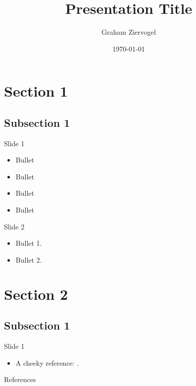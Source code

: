 \documentclass[10pt]{beamer}
\title{Presentation Title}
\author{Graham Ziervogel}
\institute{Organisation}
\date{\today}
\begin{document}
\begin{frame}
	\titlepage
\end{frame}

\section{Section 1}
\subsection{Subsection 1}

\begin{frame}{Slide 1}
\begin{itemize}
\pause
\item Bullet
\pause
\item Bullet
\pause
\item Bullet
\pause
\item Bullet
\end{itemize}
\end{frame}

\begin{frame}{Slide 2}
\begin{itemize}
\pause
\item Bullet 1.
\pause
\item Bullet 2.
\end{itemize}
\end{frame}

\section{Section 2}
\subsection{Subsection 1}

\begin{frame}{Slide 1}
\begin{itemize}
\pause
\item A cheeky reference: \cite{AA14}.
\end{itemize}
\end{frame}

\begin{frame}{References}
	\footnotesize
	
	
\end{frame}
\end{document}
